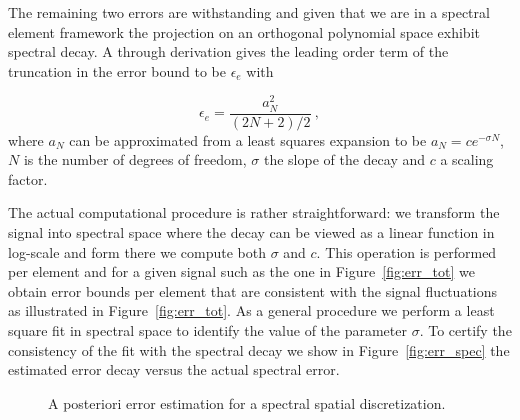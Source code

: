 \documentclass[10pt]{article}
\begin{document}
The remaining two errors are withstanding and given that we are in a spectral element framework the projection on an orthogonal polynomial space exhibit spectral decay. A through derivation gives the leading order term of the truncation in the error bound to be $\epsilon_e$ with

$$\epsilon_e=\frac{a_N^2}{(2N+2)/2}\ , $$
where $a_N$ can be approximated from a least squares expansion to be $a_N=ce^{-\sigma N}$, $N$ is the number of degrees of freedom, $\sigma$ the slope of the decay and $c$ a scaling factor. 

The actual computational procedure is rather straightforward: we transform the signal into spectral space where the decay can be viewed as a linear function in log-scale and form there we compute both $\sigma$ and $c$.
This operation is performed per element and for a given signal such as the one in Figure~\ref{fig:err_tot} we obtain error bounds per element that are consistent with the signal fluctuations as illustrated in Figure~\ref{fig:err_tot}. As a general procedure we perform a least square fit in spectral space to identify the value of the parameter $\sigma$. To certify the consistency of the fit with the spectral decay we show in Figure~\ref{fig:err_spec} the estimated error decay versus the actual spectral error.




\begin{figure}[!ht]
\centering
{}
\quad
{}
\caption{A posteriori error estimation for a spectral spatial discretization.}
\end{figure}
\end{document}

